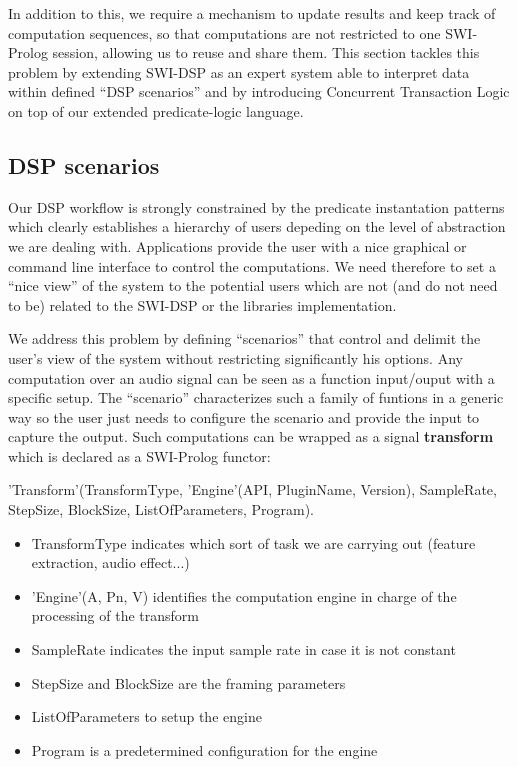 \documentclass[runningheads]{llncs}
\begin{document}
In addition to this, we require a mechanism to update results and keep track of computation sequences, so that computations are not restricted to one SWI-Prolog session, allowing us to reuse and share them. This section tackles this problem by extending SWI-DSP as an expert system able to interpret data within defined ``DSP scenarios'' and by introducing Concurrent Transaction Logic on top of our extended predicate-logic language.

\subsection{DSP scenarios}\label{subsec:scenarios}

Our DSP workflow is strongly constrained by the predicate instantation patterns which clearly establishes a hierarchy of users depeding on the level of abstraction we are dealing with. Applications provide the user with a nice graphical or command line interface to control the computations. We need therefore to set a ``nice view'' of the system to the potential users which are not (and do not need to be) related to the SWI-DSP or the libraries implementation.

We address this problem by defining ``scenarios'' that control and delimit the user's view of the system without restricting significantly his options. Any computation over an audio signal can be seen as a function input/ouput with a specific setup. The ``scenario'' characterizes such a family of funtions in a generic way so the user just needs to configure the scenario and provide the input to capture the output. Such computations can be wrapped as a signal \textbf{transform} which is declared as a SWI-Prolog functor:

'Transform'(TransformType, 'Engine'(API, PluginName, Version), SampleRate, StepSize, BlockSize, ListOfParameters, Program).

\begin{itemize}

 \item TransformType indicates which sort of task we are carrying out (feature extraction, audio effect...)
 \item 'Engine'(A, Pn, V) identifies the computation engine in charge of the processing of the transform
 \item SampleRate indicates the input sample rate in case it is not constant
 \item StepSize and BlockSize are the framing parameters
 \item ListOfParameters to setup the engine
 \item Program is a predetermined configuration for the engine
\end{itemize}
\end{document}
